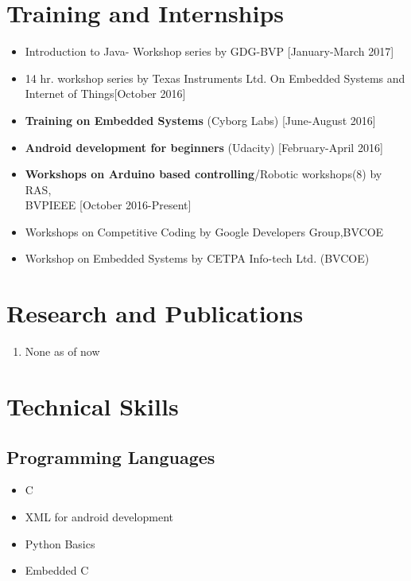 \documentclass[11pt]{article}
\begin{document}
\begin{minipage}{0.80\linewidth}
\section{\color{magenta}Tra\color{black}ining and Internships}
\begin{itemize}
\item Introduction to Java- Workshop series by GDG-BVP [January-March 2017]
\item 14 hr. workshop series by Texas Instruments Ltd. On Embedded Systems and\\ Internet of Things[October 2016]
\item \textbf{Training on Embedded Systems} (Cyborg Labs) [June-August 2016]
\item \textbf{Android development for beginners} (Udacity) [February-April 2016]
\item \textbf{Workshops on Arduino based controlling}/Robotic workshops(8) by RAS,\\ BVPIEEE [October 2016-Present]
\item Workshops on Competitive Coding by Google Developers Group,BVCOE
\item Workshop on Embedded Systems by CETPA Info-tech Ltd. (BVCOE)
\end{itemize}

\section{\color{blue}Res\color{black}earch and Publications}
\begin{enumerate}
\item None as of now
\end{enumerate}

\section{\color{cyan}Tec\color{black}hnical Skills}
\subsection{Programming Languages}
\begin{itemize}
\item C
\item XML for android development
\item Python Basics
\item Embedded C
\end{itemize}
\end{minipage}
\begin{minipage}{0.20\linewidth}
~\\
\end{minipage}
\end{document}

